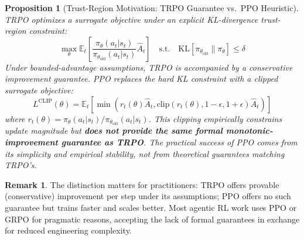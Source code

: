 \documentclass[12pt,a4paper]{report}
\newtheorem{proposition}[theorem]{Proposition}
\theoremstyle{definition}
\newtheorem{remark}[theorem]{Remark}
\begin{document}
\begin{proposition}[Trust-Region Motivation: TRPO Guarantee vs.\ PPO Heuristic]
\label{prop:convergence}
TRPO \cite{schulman2015trust} optimizes a surrogate objective under an explicit KL-divergence trust-region constraint:
\begin{equation}
\max_\theta \mathbb{E}_t\left[\frac{\pi_\theta(a_t|s_t)}{\pi_{\theta_{\text{old}}}(a_t|s_t)} \hat{A}_t\right] \quad \text{s.t.} \quad \text{KL}[\pi_{\theta_{\text{old}}} \| \pi_\theta] \leq \delta
\end{equation}
Under bounded-advantage assumptions, TRPO is accompanied by a conservative improvement guarantee. PPO \cite{schulman2017ppo} replaces the hard KL constraint with a clipped surrogate objective:
\begin{equation}
L^{\text{CLIP}}(\theta) = \mathbb{E}_t\left[\min\left(r_t(\theta)\hat{A}_t, \text{clip}(r_t(\theta), 1-\epsilon, 1+\epsilon)\hat{A}_t\right)\right]
\end{equation}
where $r_t(\theta) = \pi_\theta(a_t|s_t)/\pi_{\theta_{\text{old}}}(a_t|s_t)$. This clipping empirically constrains update magnitude but \textbf{does not provide the same formal monotonic-improvement guarantee as TRPO}. The practical success of PPO comes from its simplicity and empirical stability, not from theoretical guarantees matching TRPO's.
\end{proposition}

\begin{remark}
The distinction matters for practitioners: TRPO offers provable (conservative) improvement per step under its assumptions; PPO offers no such guarantee but trains faster and scales better. Most agentic RL work uses PPO or GRPO for pragmatic reasons, accepting the lack of formal guarantees in exchange for reduced engineering complexity.
\end{remark}
\end{document}

